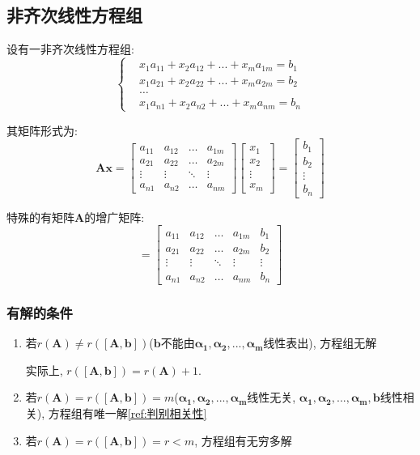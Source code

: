 \subsection{非齐次线性方程组}
设有一非齐次线性方程组:
\begin{equation*}
\left\{\begin{aligned}
& x_{1}a_{11}+x_{2}a_{12}+...+x_{m}a_{1m}=b_{1} \\
& x_{1}a_{21}+x_{2}a_{22}+...+x_{m}a_{2m}=b_{2} \\
& \dots \\
& x_{1}a_{n1}+x_{2}a_{n2}+...+x_{m}a_{nm}=b_{n}
\end{aligned}
\right.
\end{equation*}\par
其矩阵形式为:
\begin{equation*}
\bm{A}\bm{x}=\begin{bmatrix}
a_{11} & a_{12} & \dots & a_{1m} \\
a_{21} & a_{22} & \dots & a_{2m} \\
\vdots & \vdots & \ddots & \vdots \\
a_{n1} & a_{n2} & \dots & a_{nm}
\end{bmatrix}
\begin{bmatrix}
x_{1} \\
x_{2} \\
\vdots \\
x_{m}
\end{bmatrix}=
\begin{bmatrix}
b_{1} \\
b_{2} \\
\vdots \\
b_{n}
\end{bmatrix}
\end{equation*}\par
特殊的有矩阵$ \bm{A} $的增广矩阵:
\begin{equation*}
[\bm{A},\bm{b}]=\begin{bmatrix}
a_{11} & a_{12} & \dots & a_{1m} & b_{1} \\
a_{21} & a_{22} & \dots & a_{2m} & b_{2} \\
\vdots & \vdots & \ddots & \vdots & \vdots \\
a_{n1} & a_{n2} & \dots & a_{nm} & b_{n}
\end{bmatrix}
\end{equation*}
\subsubsection{有解的条件}
\begin{enumerate}
\item 若$ r(\bm{A})\neq r([\bm{A},\bm{b}]) $($ \bm{b} $不能由$ \bm{\alpha_{1}},\bm{\alpha_{2}},...,\bm{\alpha_{m}} $线性表出), 方程组无解 \par
实际上, $ r([\bm{A},\bm{b}]) = r(\bm{A}) + 1 $.
\item 若$ r(\bm{A})=r([\bm{A},\bm{b}])=m $($ \bm{\alpha_{1}},\bm{\alpha_{2}},...,\bm{\alpha_{m}} $线性无关, $ \bm{\alpha_{1}},\bm{\alpha_{2}},...,\bm{\alpha_{m}},\bm{b} $线性相关), 方程组有唯一解\ref{ref:判别相关性}
\item 若$ r(\bm{A})=r([\bm{A},\bm{b}])=r<m $, 方程组有无穷多解
\end{enumerate}
